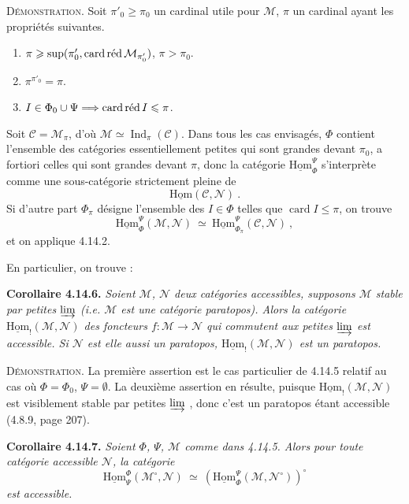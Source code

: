 \documentclass[11pt]{article}
\newcommand{\printedpage}[1]{\marginpar{\footnotesize p.~#1}}
\newcommand{\msp}[1]{\marginpar{\footnotesize [#1]}}
\newcommand{\card}{\operatorname{card}}
\DeclareMathOperator{\Ind}{Ind}
\newcommand{\cardred}{\mathop{\textup{card\,réd}}\nolimits}
\newcommand{\uHom}{\underline{\mathrm{Hom}}}
\begin{document}
\noindent\textsc{Démonstration}. Soit $\pi'_0\geqslant\pi_0$ un cardinal utile pour $\mathcal{M}$, $\pi$ un cardinal ayant les propriétés suivantes.
\begin{enumerate}[leftmargin=2.5em]
\item[a)] $\pi\geqslant\sup(\pi'_0,\cardred\mathcal{M}_{\pi'_0})$, $\pi>\pi_0$.
\item[b)] $\pi^{\pi'_0}=\pi$.
\item[c)] $I\in\Phi_0\cup\Psi\Longrightarrow\cardred I\leqslant\pi$.
\end{enumerate}
\noindent Soit $\mathcal{C}=\mathcal{M}_\pi$, d'où $\mathcal{M}\simeq\Ind_\pi(\mathcal{C})$. Dans tous les cas envisagés, $\Phi$ contient l'ensemble des catégories essentiellement petites qui sont grandes devant $\pi_0$, a fortiori celles qui sont grandes devant $\pi$, donc la catégorie $\uHom^{\Psi}_{\Phi}$ s'interprète comme une sous-catégorie strictement pleine de
\[
\uHom(\mathcal{C},\mathcal{N})\ .
\]
Si d'autre part $\Phi_\pi$ désigne l'ensemble des $I\in\Phi$ telles que $\card I\leqslant\pi$, on trouve
\[
\uHom^{\Psi}_{\Phi}(\mathcal{M},\mathcal{N})\ \simeq\ \uHom^{\Psi}_{\Phi_\pi}(\mathcal{C},\mathcal{N})\ ,
\]
et on applique 4.14.2.

\printedpage{143}
\msp{page 377}

En particulier, on trouve :

\noindent\textbf{Corollaire 4.14.6.} {\itshape Soient $\mathcal{M}$, $\mathcal{N}$ deux catégories accessibles, supposons $\mathcal{M}$ stable par petites $\varinjlim$ (i.e. $\mathcal{M}$ est une catégorie paratopos). Alors la catégorie $\uHom_{!}(\mathcal{M},\mathcal{N})$ des foncteurs $f:\mathcal{M}\longrightarrow\mathcal{N}$ qui commutent aux petites $\varinjlim$ est accessible. Si $\mathcal{N}$ est elle aussi un paratopos, $\uHom_{!}(\mathcal{M},\mathcal{N})$ est un paratopos.}

\noindent\textsc{Démonstration}. La première assertion est le cas particulier de 4.14.5 relatif au cas où $\Phi=\Phi_0$, $\Psi=\emptyset$. La deuxième assertion en résulte, puisque $\uHom_{!}(\mathcal{M},\mathcal{N})$ est visiblement stable par petites $\varinjlim$ , donc c'est un paratopos étant accessible (4.8.9, page 207).

\noindent\textbf{Corollaire 4.14.7.} {\itshape Soient $\Phi$, $\Psi$, $\mathcal{M}$ comme dans 4.14.5. Alors pour toute catégorie accessible $\mathcal{N}$, la catégorie
\msp{page 378}
\[
\uHom^{\Phi}_{\Psi}(\mathcal{M}^{\circ},\mathcal{N})\ \simeq\ (\uHom^{\Psi}_{\Phi}(\mathcal{M},\mathcal{N}^{\circ}))^{\circ}
\]
est accessible.}
\end{document}
